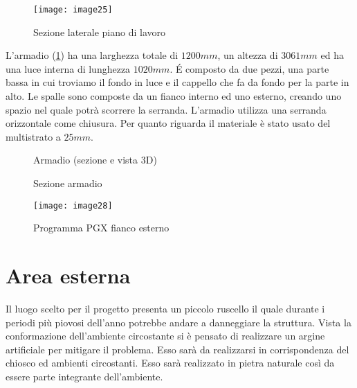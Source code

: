 \begin{figure}[H]
	\centering
	\texttt{[image: image25]}
	\caption{Sezione laterale piano di lavoro}
\end{figure}

\noindent
L'armadio (\cref{fig:armadio}) ha una larghezza totale di $1200 mm$, un altezza di $3061 mm$ ed ha  una luce interna di  lunghezza $1020 mm$. É composto da  due pezzi, una parte bassa in cui troviamo il fondo in luce e il cappello che fa da fondo per la parte in alto.   Le spalle sono composte da un fianco interno ed uno esterno, creando uno spazio nel quale potrà scorrere la serranda. L'armadio utilizza una serranda orizzontale come chiusura. Per quanto riguarda il materiale  è stato usato del multistrato a $25mm$.

\begin{figure}[H]
	\captionsetup[subfloat]{farskip=2pt,captionskip=8pt}
	\centering
	\hspace{1cm}
	
	\caption{Armadio (sezione e vista 3D)}
	\label{fig:armadio}
\end{figure}

\begin{figure}[H]
	\captionsetup[subfloat]{farskip=2pt,captionskip=8pt}
	\centering
	\hspace{1cm}
	
	\caption{Sezione armadio}
	\label{fig:imagesizes}
\end{figure}


\begin{figure}[H]
	\centering
	\texttt{[image: image28]}
	\caption{Programma PGX fianco esterno}
	\label{fig:mesh1}
\end{figure}


\newpage
\section{Area esterna}

Il luogo scelto per  il progetto presenta un piccolo ruscello il quale durante i periodi più piovosi dell'anno potrebbe andare a danneggiare la struttura. Vista la conformazione dell'ambiente circostante si è pensato di realizzare un argine artificiale per mitigare il problema. Esso sarà da realizzarsi in corrispondenza del chiosco ed ambienti circostanti. Esso sarà realizzato in pietra naturale così da essere parte integrante dell'ambiente. 

